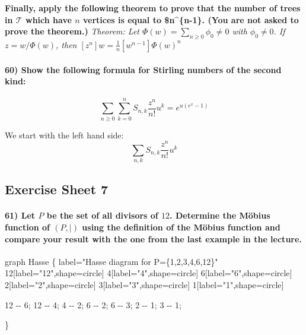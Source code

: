\documentclass[
]{article}
\newenvironment{Shaded}{}{}
\newcommand{\NormalTok}[1]{#1}
\begin{document}
\textbf{Finally, apply the following theorem to prove that the number of
trees in \(\mathcal{T}\) which have \(n\) vertices is equal to
\$n\^{}\{n-1\}. (You are not asked to prove the theorem.)}
\emph{Theorem: Let \(\Phi(w) = \sum_{n \geq 0} \phi_0 \neq 0\) with
\(\phi_0 \neq 0\). If \(z = w/\Phi(w)\), then
\([z^n]w = \frac{1}{n} [w^{n-1}] \Phi(w)^n\)}

\hypertarget{show-the-following-formula-for-stirling-numbers-of-the-second-kind}{%
\paragraph{60) Show the following formula for Stirling numbers of the
second
kind:}\label{show-the-following-formula-for-stirling-numbers-of-the-second-kind}}

\[
\sum_{n \geq 0} \sum_{k = 0}^{n} S_{n,k} \frac{z^n}{n!} u^k = e^{u(e^x -1)}
\]

We start with the left hand side: \[
\sum_{n,k} S_{n,k} \frac{z^n}{n!} u^k
\]

\hypertarget{exercise-sheet-7}{%
\subsection{Exercise Sheet 7}\label{exercise-sheet-7}}

\hypertarget{let-p-be-the-set-of-all-divisors-of-12.-determine-the-muxf6bius-function-of-p-using-the-definition-of-the-muxf6bius-function-and-compare-your-result-with-the-one-from-the-last-example-in-the-lecture.}{%
\paragraph{\texorpdfstring{61) Let \(P\) be the set of all divisors of
\(12\). Determine the Möbius function of \((P,|)\) using the definition
of the Möbius function and compare your result with the one from the
last example in the
lecture.}{61) Let P be the set of all divisors of 12. Determine the Möbius function of (P,\textbar) using the definition of the Möbius function and compare your result with the one from the last example in the lecture.}}\label{let-p-be-the-set-of-all-divisors-of-12.-determine-the-muxf6bius-function-of-p-using-the-definition-of-the-muxf6bius-function-and-compare-your-result-with-the-one-from-the-last-example-in-the-lecture.}}

\begin{Shaded}
\begin{Highlighting}[]
\NormalTok{graph Hasse \{ }
\NormalTok{    label="Hasse diagram for P=\{1,2,3,4,6,12\}"}
\NormalTok{    12[label="12",shape=circle]}
\NormalTok{    4[label="4",shape=circle]}
\NormalTok{    6[label="6",shape=circle]}
\NormalTok{    2[label="2",shape=circle]}
\NormalTok{    3[label="3",shape=circle]}
\NormalTok{    1[label="1",shape=circle]}
    
\NormalTok{    12 {-}{-} 6;}
\NormalTok{    12 {-}{-} 4;}
\NormalTok{    4 {-}{-} 2;}
\NormalTok{    6 {-}{-} 2;}
\NormalTok{    6 {-}{-} 3;}
\NormalTok{    2 {-}{-} 1;}
\NormalTok{    3 {-}{-} 1;}
    
\NormalTok{\} }
\end{Highlighting}
\end{Shaded}
\end{document}
